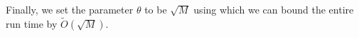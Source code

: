 Finally, we set the parameter $\theta$ to be $\sqrt{M}$ using which we can bound the entire run time by $\tilde{O}(\sqrt{M})$. 

